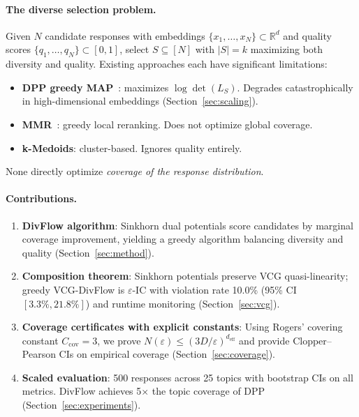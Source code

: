 \documentclass[10pt]{article}
\begin{document}
\paragraph{The diverse selection problem.}
Given $N$ candidate responses with embeddings $\{x_1, \ldots, x_N\} \subset \mathbb{R}^d$ and quality scores $\{q_1, \ldots, q_N\} \subset [0,1]$, select $S \subseteq [N]$ with $|S| = k$ maximizing both diversity and quality.
Existing approaches each have significant limitations:
\begin{itemize}[leftmargin=*,itemsep=1pt]
  \item \textbf{DPP greedy MAP}~\citep{kulesza2012determinantal}: maximizes $\log\det(L_S)$. Degrades catastrophically in high-dimensional embeddings (Section~\ref{sec:scaling}).
  \item \textbf{MMR}~\citep{carbonell1998mmr}: greedy local reranking. Does not optimize global coverage.
  \item \textbf{k-Medoids}: cluster-based. Ignores quality entirely.
\end{itemize}
None directly optimize \emph{coverage of the response distribution}.

\paragraph{Contributions.}
\begin{enumerate}[leftmargin=*,itemsep=2pt]
  \item \textbf{DivFlow algorithm}: Sinkhorn dual potentials score candidates by marginal coverage improvement, yielding a greedy algorithm balancing diversity and quality (Section~\ref{sec:method}).
  \item \textbf{Composition theorem}: Sinkhorn potentials preserve VCG quasi-linearity; greedy VCG-DivFlow is $\varepsilon$-IC with violation rate 10.0\% (95\% CI $[3.3\%, 21.8\%]$) and runtime monitoring (Section~\ref{sec:vcg}).
  \item \textbf{Coverage certificates with explicit constants}: Using Rogers' covering constant $C_{\mathrm{cov}} = 3$, we prove $N(\varepsilon) \leq (3D/\varepsilon)^{d_{\mathrm{eff}}}$ and provide Clopper--Pearson CIs on empirical coverage (Section~\ref{sec:coverage}).
  \item \textbf{Scaled evaluation}: 500 responses across 25 topics with bootstrap CIs on all metrics. DivFlow achieves 5$\times$ the topic coverage of DPP (Section~\ref{sec:experiments}).
\end{enumerate}
\end{document}

